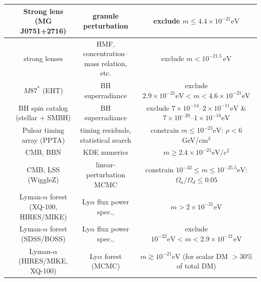\begin{table}[!htbp]
{\begin{tabular}{|c|c|c|c|}
            \hline \cite{powell2023lensed}               & Strong lens (MG J0751+2716)                          & granule perturbation                          & exclude $m \le 4.4 \times 10^{-21}\mathrm{eV}$ \\
            \hline \cite{laroche2022quantumfluctuations} & strong lenses                                        & HMF, concentration--mass relation, etc.       & exclude $m<10^{-21.5}\,\mathrm{eV}$ \\
            \hline
            \hline \cite{davoudiasl2019ultra}            & $M87^*$ (EHT)                                        & BH superradiance                              & exclude $2.9\times10^{-21}\mathrm{eV}<m<4.6\times10^{-21}\mathrm{eV}$ \\
            \hline \cite{stott2018black}                 & BH spin catalog (stellar + SMBH)                     & BH superradiance                              & exclude $7\times10^{-14}$--$2\times10^{-11}\mathrm{eV}$ \& $7\times10^{-20}$--$1\times10^{-16}\mathrm{eV}$ \\
            \hline
            \hline \cite{porayko2018parkes}              & Pulsar timing array (PPTA)                           & timing residuals, statistical search          & constrain $m\le10^{-23}\mathrm{eV}$: $\rho<6$ GeV/cm$^3$ \\
            \hline
            \hline \cite{li2014cosmological}             & CMB, BBN                                             & KDE numerics                                  & $m \ge 2.4\times10^{-21}\mathrm{eV}/c^2$ \\
            \hline \cite{hlozek2015search}               & CMB, LSS (WiggleZ)                                   & linear-perturbation MCMC                      & constrain $10^{-32} \le m \le 10^{-25.5}\mathrm{eV}$: $\Omega_a/\Omega_d\le0.05$ \\
            \hline
            \hline \cite{irsic2017first}                 & Lyman-$\alpha$ forest (XQ-100, HIRES/MIKE)            & Ly$\alpha$ flux power spec.,                  & $m>2\times10^{-21}\mathrm{eV}$ \\
            \hline \cite{armengaud2017constraining}      & Lyman-$\alpha$ forest (SDSS/BOSS)                     & Ly$\alpha$ flux power spec.,                  & exclude $10^{-22}\mathrm{eV}<m<2.9\times10^{-21}\mathrm{eV}$ \\
            \hline \cite{kobayashi2017lyman}             & Lyman-$\alpha$ (HIRES/MIKE, XQ-100)                   & Ly$\alpha$ forest (MCMC)                      & $m\gtrsim10^{-21}\mathrm{eV}$ (for scalar DM $>30\%$ of total DM) \\

\end{tabular}}
\end{table}
